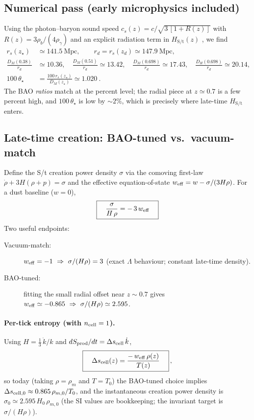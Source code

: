 \subsection{Numerical pass (early microphysics included)}
Using the photon--baryon sound speed $c_s(z)=c/\sqrt{3\,[1+R(z)]}$ with $R(z)=3\rho_b/(4\rho_\gamma)$ and an explicit radiation term in $H_{\text{S/t}}(z)$ \cite{husugiyama1996,eisenstein1998}, we find
\begin{align*}
  r_s(z_\star)&\simeq 141.5~\mathrm{Mpc},\qquad r_d=r_s(z_d)\simeq 147.9~\mathrm{Mpc},\\
  \frac{D_M(0.38)}{r_d}&\simeq 10.36,\quad \frac{D_M(0.51)}{r_d}\simeq 13.42,\quad
  \frac{D_M(0.698)}{r_d}\simeq 17.43,\quad \frac{D_H(0.698)}{r_d}\simeq 20.14,\\
  100\,\theta_\star&=\frac{100\,r_s(z_\star)}{D_M(z_\star)}\simeq 1.020~.
\end{align*}
The BAO \emph{ratios} match at the percent level; the radial piece at $z\simeq0.7$ is a few percent high, and $100\,\theta_\star$ is low by $\sim2\%$, which is precisely where late-time $H_{\text{S/t}}$ enters.

\subsection{Late-time creation: BAO-tuned vs.\ vacuum-match}
Define the S/t creation power density $\sigma$ via the comoving first-law
$\dot\rho+3H(\rho+p)=\sigma$ and the effective equation-of-state
$w_{\rm eff}=w-\sigma/(3H\rho)$. For a dust baseline ($w=0$),
\begin{equation}\label{eq:creation-strength}
\boxed{\quad \frac{\sigma}{H\,\rho}=-\,3\,w_{\rm eff}\quad}
\end{equation}
Two useful endpoints:
\begin{description}
  \item[Vacuum-match:] $w_{\rm eff}=-1\ \Rightarrow\ \sigma/(H\rho)=3$ (exact $\Lambda$ behaviour; constant late-time density).
  \item[BAO-tuned:] fitting the small radial offset near $z\sim0.7$ gives $w_{\rm eff}\simeq -0.865\ \Rightarrow\ \sigma/(H\rho)\simeq 2.595$.
\end{description}

\paragraph{Per-tick entropy (with $n_{\rm cell}=1$).}
Using $H=\tfrac13\,\dot k/k$ and $dS_{\rm prod}/dt=\Delta s_{\rm cell}\,\dot k$,
\begin{equation}\label{eq:delta-s-cell}
\boxed{\quad \Delta s_{\rm cell}(z)=\frac{-\,w_{\rm eff}\,\rho(z)}{T(z)}\quad}\,,
\end{equation}
so today (taking $\rho=\rho_m$ and $T=T_0$) the BAO-tuned choice implies
$\Delta s_{\rm cell,0}\approx 0.865\,\rho_{m,0}/T_0$, and the instantaneous creation power density is
$\sigma_0\simeq 2.595\,H_0\,\rho_{m,0}$ (the SI values are bookkeeping; the invariant target is $\sigma/(H\rho)$).


